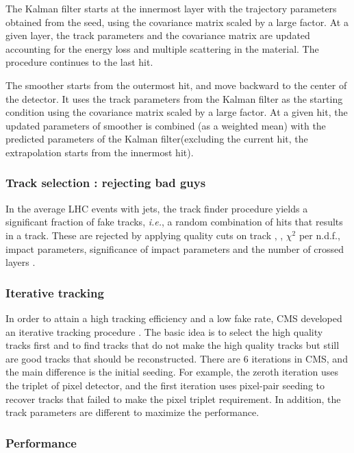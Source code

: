 The Kalman filter starts at the innermost layer with the trajectory 
parameters obtained from the seed, using the covariance matrix scaled 
by a large factor.  
At a given layer, the track parameters and the covariance matrix are updated
accounting for the energy loss and multiple scattering in the material.
The procedure continues to the last hit.

The smoother starts from the outermost hit, 
and move backward to the center of the detector. 
It uses the track parameters from the Kalman filter as the starting condition 
using the covariance matrix scaled by a large factor. 
At a given hit, the updated parameters of smoother is combined (as a weighted mean) 
with the predicted parameters of the Kalman filter(excluding the current hit, 
the extrapolation starts from the innermost hit).

\subsubsection{Track selection : rejecting bad guys }

In the average LHC events with jets, the track finder procedure yields 
a significant fraction of fake tracks, \textit{i.e.}, a random combination 
of hits that results in a track. These are rejected by applying 
quality cuts on track \Eta, \pt, $\chi^2$ per n.d.f., impact parameters,
significance of impact parameters
and the number of crossed layers \cite{cmsnotetrackfilter}. 

\subsubsection{Iterative tracking}

In order to attain a high tracking efficiency and a low fake rate, 
CMS developed an iterative tracking procedure \cite{cmsnoteiterativetracking}. 
The basic idea is to select the high quality tracks first and 
to find tracks that do not make the high quality tracks 
but still are good tracks that should be reconstructed. 
There are 6 iterations in CMS, and the main difference is 
the initial seeding. For example, the zeroth iteration uses 
the triplet of pixel detector, and the first iteration uses 
pixel-pair seeding to recover tracks that failed to make 
the pixel triplet requirement. In addition, the track parameters 
are different to maximize the performance.

\subsubsection{Performance}

